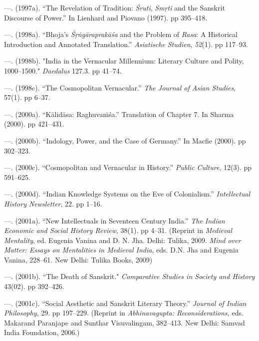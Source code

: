 \begin{thebibliography}{99}
 \item —. (1997a). “The Revelation of Tradition: \textit{Śruti}, \textit{Smṛti} and the Sanskrit Discourse of Power.” In Lienhard and Piovano (1997). pp 395–418.

 \item —. (1998a). “Bhoja's \textit{Śṛṅgāraprakāśa} and the Problem of \textit{Rasa}: A Historical Introduction and Annotated Translation.” \textit{Asiatische Studien}, \textit{52}(1). pp 117–93.

 \item —. (1998b). "India in the Vernacular Millennium: Literary Culture and Polity, 1000–1500." \textit{Daedalus} 127.3. pp 41–74.

 \item —. (1998c). “The Cosmopolitan Vernacular.” \textit{The Journal of Asian Studies}, 57(1). pp 6–37.

 \item —. (2000a). “Kālidāsa: Raghuvaṁśa.” Translation of Chapter 7. In Sharma (2000). pp 421–431.

 \item —. (2000b). “Indology, Power, and the Case of Germany.” In Macfie (2000). pp 302–323.

 \item —. (2000c). “Cosmopolitan and Vernacular in History.” \textit{Public Culture}, 12(3). pp 591–625.

 \item —. (2000d). “Indian Knowledge Systems on the Eve of Colonialism.” \textit{Intellectual History Newsletter}, 22. pp 1–16.

 \item —. (2001a). “New Intellectuals in Seventeen Century India.” \textit{The Indian Economic and Social History Review}, 38(1). pp 4–31. (Reprint in \textit{Medieval Mentality}, ed. Eugenia Vanina and D. N. Jha. Delhi: Tulika, 2009. \textit{Mind over Matter: Essays on Mentalities in Medieval India}, eds. D.N. Jha and Eugenia Vanina, 228–61. New Delhi: Tulika Books, 2009)

 \item —. (2001b). “The Death of Sanskrit." \textit{Comparative Studies in Society and History} 43(02). pp 392–426.

 \item —. (2001c). “Social Aesthetic and Sanskrit Literary Theory.” \textit{Journal of Indian Philosophy}, 29. pp 197–229. (Reprint in \textit{Abhinavagupta: Reconsiderations, }eds. Makarand Paranjape and Sunthar Visuvalingam, 382–413. New Delhi: Samvad India Foundation, 2006.)


\end{thebibliography}
